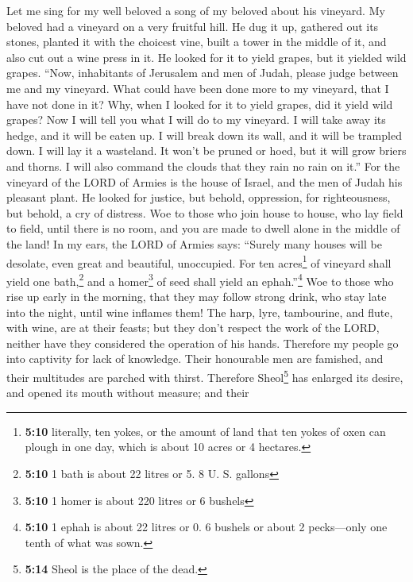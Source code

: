  Let me sing for my well beloved a song of my beloved
about his vineyard. My beloved had a vineyard on a very fruitful hill.
 He dug it up, gathered out its stones, planted it with
the choicest vine, built a tower in the middle of it, and also cut out a
wine press in it. He looked for it to yield grapes, but it yielded wild
grapes.  ``Now, inhabitants of Jerusalem and men of Judah,
please judge between me and my vineyard.  What could have
been done more to my vineyard, that I have not done in it? Why, when I
looked for it to yield grapes, did it yield wild grapes? 
Now I will tell you what I will do to my vineyard. I will take away its
hedge, and it will be eaten up. I will break down its wall, and it will
be trampled down.  I will lay it a wasteland. It won't be
pruned or hoed, but it will grow briers and thorns. I will also command
the clouds that they rain no rain on it.''  For the
vineyard of the LORD of Armies is the house of Israel, and the men of
Judah his pleasant plant. He looked for justice, but behold, oppression,
for righteousness, but behold, a cry of distress.  Woe to
those who join house to house, who lay field to field, until there is no
room, and you are made to dwell alone in the middle of the land!
 In my ears, the LORD of Armies says: ``Surely many houses
will be desolate, even great and beautiful, unoccupied. 
For ten acres\footnote{\textbf{5:10} literally, ten yokes, or the amount
  of land that ten yokes of oxen can plough in one day, which is about
  10 acres or 4 hectares.} of vineyard shall yield one bath,\footnote{\textbf{5:10}
  1 bath is about 22 litres or 5. 8 U. S. gallons} and a
homer\footnote{\textbf{5:10} 1 homer is about 220 litres or 6 bushels}
of seed shall yield an ephah.''\footnote{\textbf{5:10} 1 ephah is about
  22 litres or 0. 6 bushels or about 2 pecks---only one tenth of what
  was sown.}  Woe to those who rise up early in the
morning, that they may follow strong drink, who stay late into the
night, until wine inflames them!  The harp, lyre,
tambourine, and flute, with wine, are at their feasts; but they don't
respect the work of the LORD, neither have they considered the operation
of his hands.  Therefore my people go into captivity for
lack of knowledge. Their honourable men are famished, and their
multitudes are parched with thirst.  Therefore
Sheol\footnote{\textbf{5:14} Sheol is the place of the dead.} has
enlarged its desire, and opened its mouth without measure; and their
